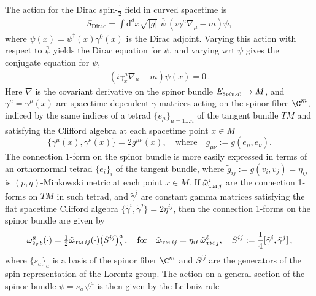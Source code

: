 

\begin{mytheorem}
%
The action for the Dirac spin-$\tfrac12$ field in curved spacetime is
\begin{align}
    S_\text{Dirac} = \int \mathrm{d}^d x \sqrt{|g|} \,\, \bar{\psi}\, (i \gamma^\mu \nabla_\mu - m) \psi,
\end{align}
where $\bar{\psi}(x) = \psi^\dagger(x) \gamma^0(x)$ is the Dirac adjoint.
Varying this action with respect to $\bar{\psi}$ yields the Dirac equation for $\psi$, and varying wrt $\psi$ gives the conjugate equation for $\bar{\psi}$,
\begin{align}
    (i \gamma^\mu_x \nabla_\mu - m) \psi(x) = 0\,.
\end{align}
Here $\nabla$ is the covariant derivative on the spinor bundle $E_{\text{\tiny Sp(p,q)}}\to M$, and $\gamma^\mu=\gamma^\mu(x)$ are spacetime dependent $\gamma$-matrices acting on the spinor fibre $\C^m$, indiced by the same indices of a tetrad $\{e_{\mu}\}_{\mu=1\dots n}$ of the tangent bundle $TM$ and satisfying the Clifford algebra at each spacetime point $x\in M$
\begin{equation}
    \{\gamma^\mu(x), \gamma^\nu(x)\} = 2 g^{\mu\nu}(x),\quad \text{where}\quad g_{\mu\nu}:=g(e_\mu,e_\nu).
\end{equation}
The connection 1-form on the spinor bundle is more easily expressed in terms of an orthornormal tetrad $\{\tilde{e}_i\}_i$ of the tangent bundle, where $\tilde{g}_{ij}:=g(v_i,v_j)=\eta_{ij}$ is $(p,q)$-Minkowski metric at each point $x\in M$.
If $\tilde{\omega}_{\text{\tiny TM}\,j}^i$ are the connection 1-forms on $TM$ in such tetrad, and $\tilde{\gamma}^i$ are constant gamma matrices satisfying the flat spacetime Clifford algebra $\{\tilde{\gamma}^i,\tilde{\gamma}^j\}=2 \eta^{ij}$, then the connection 1-forms on the spinor bundle are given by
\begin{align}
    \omega_{\text{\tiny Sp}\,b}^a(\cdot) = \tfrac{1}{2} \tilde{\omega}_{\text{\tiny TM}\,ij}(\cdot) \big(S^{ij}\big)^a_{b}\,,\quad \text{for}\quad \tilde{\omega}_{\text{\tiny TM}\,ij}= \eta_{i\ell}\,\tilde{\omega}^\ell_{\text{\tiny TM}\,j},\quad S^{ij} := \frac{1}{4} [\tilde{\gamma}^i, \tilde{\gamma}^j]\,,
\end{align}
where $\{s_a\}_a$ is a basis of the spinor fiber $\C^m$ and $S^{ij}$ are the generators of the spin representation of the Lorentz group.
The action on a general section of the spinor bundle $\psi=s_a\, \psi^a$ is then given by the Leibniz rule
\begin{align}

\end{align}
\end{mytheorem}

